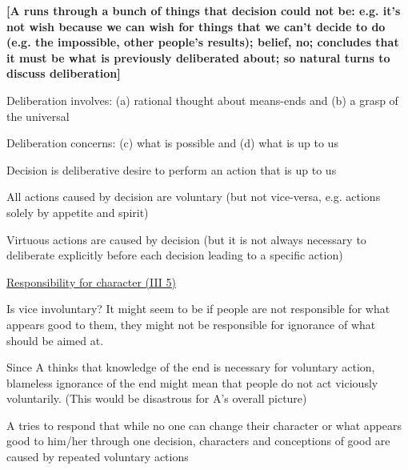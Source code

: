 \documentclass[11pt]{article}
\begin{document}
\noindent\textbf{[A runs through a bunch of things that decision could not be: e.g. it's not wish because we can wish for things that we can't decide to do (e.g. the impossible, other people's results);  belief, no; concludes that it must be what is previously deliberated about; so natural turns to discuss deliberation]}
\vspace*{2mm}

\noindent [1] Deliberation involves: (a) rational thought about means-ends and (b) a grasp of the universal
\vspace*{1mm}

\noindent [2] Deliberation concerns: (c) what is possible and (d) what is up to us
\vspace*{1mm}

\noindent [3] Decision is deliberative desire to perform an action that is up to us
\vspace*{1mm}

\noindent [4] All actions caused by decision are voluntary (but not vice-versa, e.g. actions solely by appetite and spirit)
\vspace*{1mm}

\noindent [5] Virtuous actions are caused by decision (but it is not always necessary to deliberate explicitly before each decision leading to a specific action)
\vspace*{3mm}

\noindent\underline{Responsibility for character (III 5)}
\vspace*{2mm}

\noindent Is vice involuntary? It might seem to be if people are not responsible for what appears good to them, they might not be responsible for ignorance of what should be aimed at.
\vspace*{1mm}

\noindent Since A thinks that knowledge of the end is necessary for voluntary action, blameless ignorance of the end might mean that people do not act viciously voluntarily. (This would be disastrous for A's overall picture)
\vspace*{1mm}

\noindent A tries to respond that while no one can change their character or what appears good to him/her through one decision, characters and conceptions of good are caused by repeated voluntary actions
\end{document}
